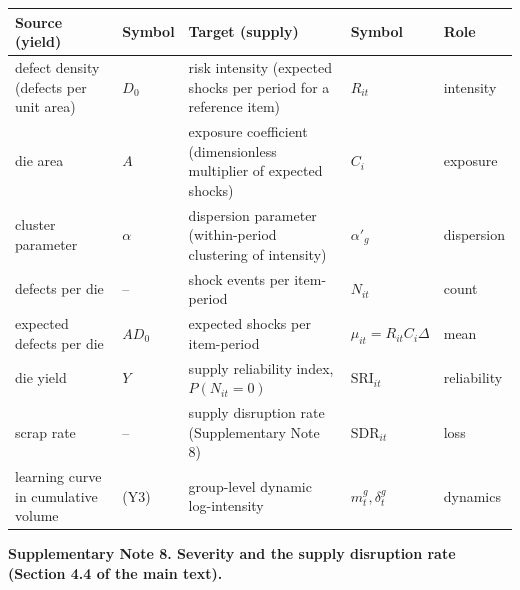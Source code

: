 \noindent\begin{minipage}{\linewidth}
\label{tab:S17}
\centering\footnotesize
\begin{tabular}{p{3.1cm}lp{5.9cm}ll}
\toprule
Source (yield) & Symbol & Target (supply) & Symbol & Role \\ \midrule
defect density (defects per unit area) & $D_{0}$ & risk intensity (expected shocks per period for a reference item) & $R_{it}$ & intensity \\
die area & $A$ & exposure coefficient (dimensionless multiplier of expected shocks) & $C_{i}$ & exposure \\
cluster parameter & $\alpha$ & dispersion parameter (within-period clustering of intensity) & $\alpha'_{g}$ & dispersion \\
defects per die & – & shock events per item-period & $N_{it}$ & count \\
expected defects per die & $AD_{0}$ & expected shocks per item-period & $\mu_{it} = R_{it}C_{i}\Delta$ & mean \\
die yield & $Y$ & supply reliability index, $P(N_{it} = 0)$ & $\mathrm{SRI}_{it}$ & reliability \\
scrap rate & – & supply disruption rate (Supplementary Note 8) & $\mathrm{SDR}_{it}$ & loss \\
learning curve in cumulative volume & (Y3) & group-level dynamic log-intensity & $m_{t}^{g},\delta_{t}^{g}$ & dynamics \\
\bottomrule
\end{tabular}
\end{minipage}
\vspace{14pt}

\textbf{Supplementary Note 8. Severity and the supply disruption rate (Section 4.4 of the main text).}

